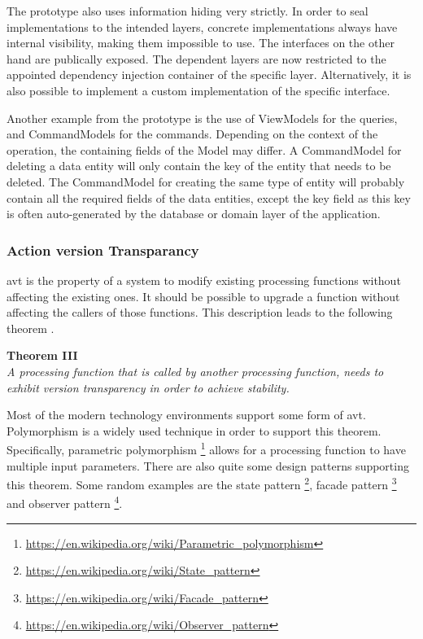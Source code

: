 The prototype also uses information hiding very strictly. In order to seal implementations
to the intended layers, concrete implementations always have internal visibility, making
them impossible to use. The interfaces on the other hand are publically exposed. The
dependent layers are now restricted to the appointed dependency injection container of the
specific layer. Alternatively, it is also possible to implement a custom implementation of
the specific interface. 

Another example from the prototype is the use of ViewModels for the queries, and
CommandModels for the commands. Depending on the context of the operation, the containing
fields of the Model may differ. A CommandModel for deleting a data entity will only
contain the key of the entity that needs to be deleted. The CommandModel for creating the
same type of entity will probably contain all the required fields of the data entities,
except the key field as this key is often auto-generated by the database or
domain layer of the application.

\subsubsection{Action version Transparancy}
\gls{avt} is the property of a system to modify existing processing functions without
affecting the existing ones. It should be possible to upgrade a function without affecting
the callers of those functions. This description leads to the following theorem
\parencite[282]{mannaert_normalized_2016}.

\begin{center}
    \textbf{Theorem III}\\
    \textit{A processing function that is called by another processing function, needs to exhibit version transparency in order to achieve stability.}
\end{center}

Most of the modern technology environments support some form of \gls{avt}. Polymorphism is
a widely used technique in order to support this theorem. Specifically, parametric
polymorphism \footnote{\url{https://en.wikipedia.org/wiki/Parametric_polymorphism}} allows
for a processing function to have multiple input parameters. There are also quite some
design patterns supporting this theorem. Some random examples are the state pattern
\footnote{\url{https://en.wikipedia.org/wiki/State_pattern}}, facade pattern
\footnote{\url{https://en.wikipedia.org/wiki/Facade_pattern}} and observer pattern
\footnote{\url{https://en.wikipedia.org/wiki/Observer_pattern}}.

